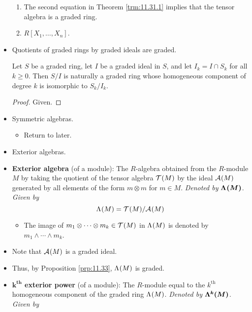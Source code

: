 \documentclass[../notes.tex]{subfiles}
\begin{document}
\begin{itemize}
    \begin{enumerate}
        \item The second equation in Theorem \ref{trm:11.31.1} implies that the tensor algebra is a graded ring.
        \item $R[X_1,\dots,X_n]$.
    \end{enumerate}
    \item Quotients of graded rings by graded ideals are graded.
    \begin{proposition}\label{prp:11.33}
        Let $S$ be a graded ring, let $I$ be a graded ideal in $S$, and let $I_k=I\cap S_k$ for all $k\geq 0$. Then $S/I$ is naturally a graded ring whose homogeneous component of degree $k$ is isomorphic to $S_k/I_k$.
        \begin{proof}
            Given.
        \end{proof}
    \end{proposition}
    \item Symmetric algebras.
    \begin{itemize}
        \item Return to later.
    \end{itemize}
    \setcounter{proposition}{35}
    \item Exterior algebras.
    \item \textbf{Exterior algebra} (of a module): The $R$-algebra obtained from the $R$-module $M$ by taking the quotient of the tensor algebra $\ten{M}$ by the ideal $\alt{M}$ generated by all elements of the form $m\otimes m$ for $m\in M$. \emph{Denoted by} $\bm{\lam{M}}$. \emph{Given by}
    \begin{equation*}
        \lam{M} = \ten{M}/\alt{M}
    \end{equation*}
    \begin{itemize}
        \item The image of $m_1\otimes\cdots\otimes m_k\in\ten{M}$ in $\lam{M}$ is denoted by $m_1\wedge\cdots\wedge m_k$.
    \end{itemize}
    \item Note that $\alt{M}$ is a graded ideal.
    \item Thus, by Proposition \ref{prp:11.33}, $\lam{M}$ is graded.
    \item \textbf{$\bm{k^\textbf{th}}$ exterior power} (of a module): The $R$-module equal to the $k^\text{th}$ homogeneous component of the graded ring $\lam{M}$. \emph{Denoted by} $\bm{\lam[k]{M}}$. \emph{Given by}
    \begin{equation*}

\end{equation*}
\end{itemize}
\end{document}
